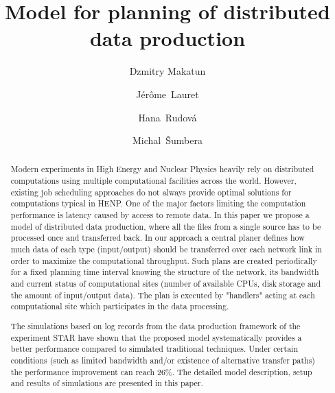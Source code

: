 \documentclass{svjour3}                     %
\begin{document}
\title{Model for planning of distributed data production}

\author{Dzmitry Makatun         \and
		J\'er\^ome~Lauret		\and
		Hana~Rudov\'a			\and
		Michal~\v{S}umbera	
}


\maketitle

\begin{abstract}
Modern experiments in High Energy and Nuclear Physics heavily rely on distributed computations using multiple computational facilities across the world. However, existing job scheduling approaches do not always provide optimal solutions for computations typical in HENP. One of the major factors limiting the computation performance is latency caused by access to remote data. In this paper we propose a model of distributed data production, where all the files from a single source has to be processed once and transferred back. In our approach a central planer defines how much data of each type (input/output) should be transferred over each network link in order to maximize the computational throughput. Such plans are created periodically for a fixed planning time interval knowing the structure of the network, its bandwidth and current status of computational sites (number of available CPUs, disk storage and the amount of input/output data). The plan is executed by "handlers" acting at each computational site which participates in the data processing. 

The simulations based on log records from the data production framework of the experiment STAR have shown that the proposed model systematically provides a better performance compared to simulated traditional techniques. Under certain conditions (such as limited bandwidth and/or existence of alternative transfer paths) the performance improvement can reach 26\%. The detailed model description, setup and results of simulations are presented in this paper.
\end{abstract}
\end{document}

